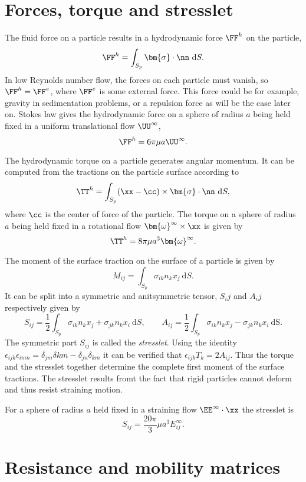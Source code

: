 \section{Forces, torque and stresslet}

The fluid force on a particle results in a hydrodynamic force $\FF^h$ on the particle,
\[ \FF^h = \int_{S_p} \bm{\sigma}\cdot\nn~\text{d}S.\]
In low Reynolds number flow, the forces on each particle must vanish, so $\FF^h = \FF^e$, where $\FF^e$ is some external force. This force could be for example, gravity in sedimentation problems, or a repulsion force as will be the case later on. Stokes law gives the hydrodynamic force on a sphere of radius $a$ being held fixed in a uniform translational flow $\UU^\infty$,
\[ \FF^h = 6\pi \mu a \UU^\infty.\]

The hydrodynamic torque on a particle generates angular momentum. It can be computed from the tractions on the particle surface according to
\[ \TT^h = \int_{S_p} (\xx - \cc)\times \bm{\sigma}\cdot\nn~\text{d}S,\]
where $\cc$ is the center of force of the particle. The torque on a sphere of radius $a$ being held fixed in a rotational flow $\bm{\omega}^\infty\times \xx$ is given by
\[ \TT^h = 8\pi \mu a^3 \bm{\omega}^\infty.\]

The moment of the surface traction on the surface of a particle is given by
\[ M_{ij} = \int_{S_p} \sigma_{ik}n_k x_j~\text{d}S.\]
It can be split into a symmetric and anitsymmetric tensor, $S_ij$ and $A_ij$ respectively given by
\[ S_{ij} = \frac{1}{2}\int_{S_p} \sigma_{ik}n_k x_j + \sigma_{jk}n_k x_i~\text{d}S,\qquad A_{ij} = \frac{1}{2}\int_{S_p} \sigma_{ik}n_k x_j - \sigma_{jk}n_k x_i~\text{dS}.\]
The symmetric part $S_{ij}$ is called the \emph{stresslet}. Using the identity $\epsilon_{ijk}\epsilon_{imn} = \delta_{jm}\delta{km}-\delta_{jn}\delta_{km}$ it can be verified that $\epsilon_{ijk}T_k = 2A_{ij}$. Thus the torque and the stresslet together determine the complete first moment of the surface tractions. The stresslet results fromt the fact that rigid particles  cannot deform and thus resist straining motion. 

For a sphere of radius $a$ held fixed in a straining flow $\EE^\infty\cdot \xx$ the stresslet is 
\[ S_{ij} = \frac{20\pi}{3}\mu a^3 E^\infty_{ij}.\]

\section{Resistance and mobility matrices}

